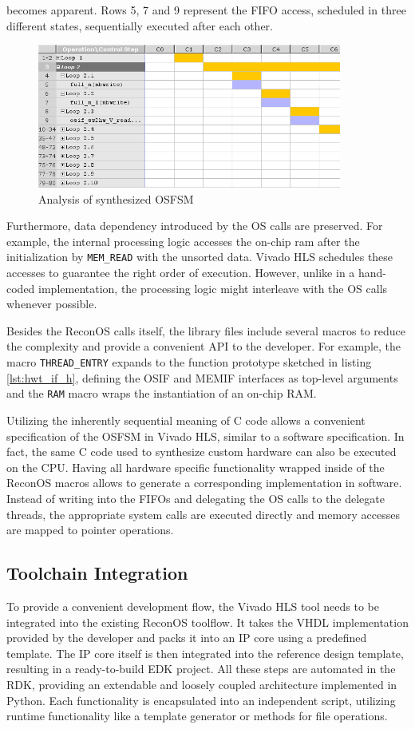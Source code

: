 becomes apparent. Rows 5, 7 and 9 represent the \ac{FIFO} access, scheduled in
three different states, sequentially executed after each other.
\begin{figure}[tb]
	\centering
	\includegraphics[width=10cm]{../figures/osfsm_a}
	\caption{Analysis of synthesized \acs{OSFSM}}
	\label{fig:osfsm_a}
\end{figure}
Furthermore, data dependency introduced by the \ac{OS} calls are preserved.
For example, the internal processing logic accesses the on-chip ram after the
initialization by \lstinline{MEM_READ} with the unsorted data. Vivado HLS
schedules these accesses to guarantee the right order of execution. However,
unlike in a hand-coded implementation, the processing logic might interleave
with the \ac{OS} calls whenever possible.

Besides the ReconOS calls itself, the library files include several macros to
reduce the complexity and provide a convenient \ac{API} to the developer. For
example, the macro \lstinline{THREAD_ENTRY} expands to the function prototype
sketched in listing \ref{lst:hwt_if_h}, defining the \ac{OSIF} and \ac{MEMIF}
interfaces as top-level arguments and the \lstinline{RAM} macro wraps the
instantiation of an on-chip \ac{RAM}.

Utilizing the inherently sequential meaning of C code allows a convenient
specification of the \ac{OSFSM} in Vivado HLS, similar to a software
specification. In fact, the same C code used to synthesize custom hardware can
also be executed on the \ac{CPU}. Having all hardware specific functionality
wrapped inside of the ReconOS macros allows to generate a corresponding
implementation in software. Instead of writing into the
\acp{FIFO} and delegating the \ac{OS} calls to the delegate threads, the
appropriate system calls are executed directly and memory accesses are mapped
to pointer operations.

\subsection{Toolchain Integration}
To provide a convenient development flow, the Vivado HLS tool needs to be
integrated into the existing ReconOS toolflow. It takes the \ac{VHDL}
implementation provided by the developer and packs it into an \ac{IP} core
using a predefined template. The \ac{IP} core itself is then integrated into
the reference design template, resulting in a ready-to-build EDK project. All
these steps are automated in the \ac{RDK}, providing an extendable and loosely
coupled architecture implemented in Python. Each functionality is encapsulated
into an independent script, utilizing runtime functionality like a template
generator or methods for file operations.

